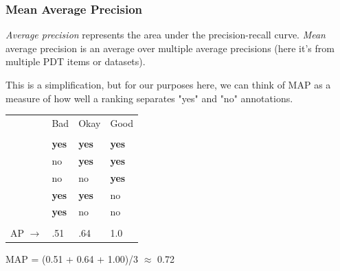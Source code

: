 \documentclass[handout,xcolor={dvipsnames}]{beamer}
\begin{document}

\begin{frame}
\frametitle{Mean Average Precision}
\small
\textit{Average precision} represents the area under the precision-recall curve. \textit{Mean} average precision is an average over multiple average precisions (here it's from multiple PDT items or datasets). \\

\vspace{.8em}

This is a simplification, but for our purposes here, we can think of MAP as a measure of how well a ranking separates "yes" and "no" annotations. \\

\begin{table}[htb!]
\begin{center}
\setlength{\tabcolsep}{.35em}
\begin{tabular}{l|l||l||l|}
\cline{2-4}
& Bad & Okay & Good \\
\cline{2-4}
\multicolumn{4}{l}{}  \\
\cline{2-4}
& \textbf{yes} & \textbf{yes} & \textbf{yes} \\
\cline{2-4}
& no & \textbf{yes} & \textbf{yes} \\
\cline{2-4}
& no & no & \textbf{yes} \\
\cline{2-4}
& \textbf{yes} & \textbf{yes} & no \\
\cline{2-4}
& \textbf{yes} & no & no \\
\cline{2-4}
\multicolumn{4}{l}{}  \\
\cline{2-4}
AP $\rightarrow$ & .51 & .64 & 1.0 \\
\cline{2-4}
\end{tabular}
\end{center}
\end{table}

\hspace{8em}MAP = (0.51 + 0.64 + 1.00)/3 $\approx$ 0.72

\end{frame}
\end{document}
